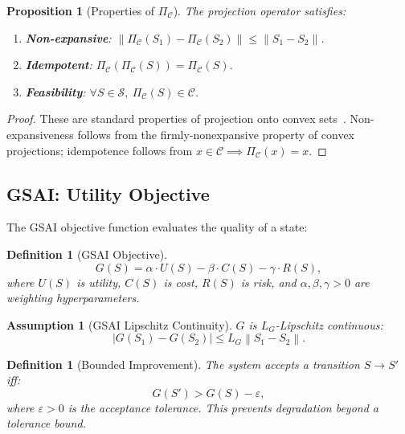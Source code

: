 \documentclass[11pt,letterpaper]{article}
\newtheorem{definition}[theorem]{Definition}
\newtheorem{assumption}[theorem]{Assumption}
\newtheorem{proposition}[theorem]{Proposition}
\newcommand{\cC}{\mathcal{C}}
\newcommand{\cS}{\mathcal{S}}
\newcommand{\pC}[1]{\Pi_{\mathcal{C}}\left(#1\right)}
\newcommand{\norm}[1]{\left\lVert#1\right\rVert}
\begin{document}
\begin{proposition}[Properties of $\Pi_{\cC}$]
\label{prop:csco_props}
The projection operator satisfies:
\begin{enumerate}[nosep]
    \item \textbf{Non-expansive}: $\norm{\pC{S_1} - \pC{S_2}} \leq
    \norm{S_1 - S_2}$.
    \item \textbf{Idempotent}: $\pC{\pC{S}} = \pC{S}$.
    \item \textbf{Feasibility}: $\forall S \in \cS,\ \pC{S} \in \cC$.
\end{enumerate}
\end{proposition}
\begin{proof}
These are standard properties of projection onto convex
sets~\cite{boyd2004convex}. Non-expansiveness follows from the
firmly-nonexpansive property of convex projections; idempotence follows
from $x \in \cC \implies \Pi_{\cC}(x) = x$.
\end{proof}

\subsection{GSAI: Utility Objective}

The GSAI objective function evaluates the quality of a state:

\begin{definition}[GSAI Objective]
\begin{equation}
    G(S) = \alpha \cdot U(S) - \beta \cdot C(S) - \gamma \cdot R(S),
    \label{eq:gsai}
\end{equation}
where $U(S)$ is utility, $C(S)$ is cost, $R(S)$ is risk, and
$\alpha, \beta, \gamma > 0$ are weighting hyperparameters.
\end{definition}

\begin{assumption}[GSAI Lipschitz Continuity]
\label{ass:gsai_lipschitz}
$G$ is $L_G$-Lipschitz continuous:
\begin{equation}
    |G(S_1) - G(S_2)| \leq L_G \norm{S_1 - S_2}.
    \label{eq:gsai_lipschitz}
\end{equation}
\end{assumption}

\begin{definition}[Bounded Improvement]
The system accepts a transition $S \to S'$ iff:
\begin{equation}
    G(S') > G(S) - \varepsilon,
    \label{eq:accept_rule}
\end{equation}
where $\varepsilon > 0$ is the acceptance tolerance. This prevents
degradation beyond a tolerance bound.
\end{definition}
\end{document}
